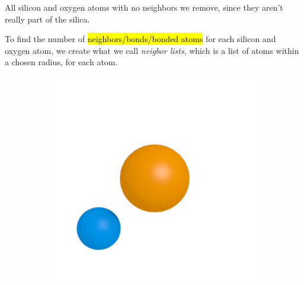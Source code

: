 All silicon and oxygen atoms with no neighbors we remove, since they aren't really part of the silica.

To find the number of \hl{neighbors/bonds/bonded atoms} for each silicon and oxygen atom, we create what we call \emph{neigbor lists}, which is a list of atoms within a chosen radius, for each atom.

\begin{figure}
    \centering
    \begin{subfigure}[b]{0.24\textwidth}
        \includegraphics[width=\textwidth]{images/passivation/tetrahedra01.png}
        \caption{}
    \end{subfigure}
    \begin{subfigure}[b]{0.24\textwidth}

\end{subfigure}
\end{figure}
